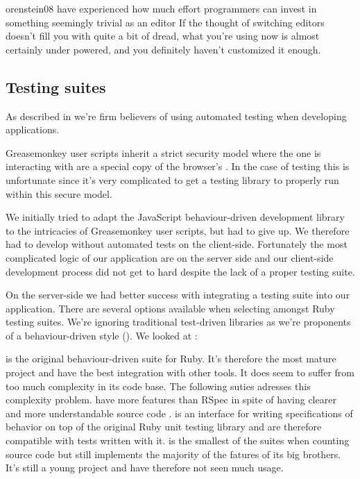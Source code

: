 \begin{fullquote}{orenstein08}{%
  have experienced how much effort programmers can
  invest in something seemingly trivial as an editor}
    If the thought of switching editors doesn't fill you with quite a bit of
    dread, what you're using now is almost certainly under powered, and you
    definitely haven't customized it enough.
\end{fullquote}

\subsection{Testing suites}

As described in  we're firm
believers of using automated testing when developing applications.

Greasemonkey user scripts inherit a strict security model where the
 one is interacting with are a special copy of the browser's
. In the case of testing this is unfortunate since it's very
complicated to get a testing library to properly run within this secure model.

We initially tried to adapt the %
JavaScript behaviour-driven development library to the intricacies of
Greasemonkey user scripts, but had to give up. We therefore had to develop
without automated tests on the client-side.
Fortunately the most complicated logic of our application are on the server
side and our client-side development process did not get to hard despite the
lack of a proper testing suite.

On the server-side we had better success with integrating a testing suite into
our application. There are several options available when selecting amongst
Ruby testing suites. We're ignoring traditional test-driven libraries as
we're proponents of a behaviour-driven style
(). We looked at%
:

\begin{items}
   is the original behaviour-driven suite for Ruby. It's
    therefore the most mature project and have the best integration with
    other tools. It does seem to suffer from too much complexity in its code
    base. The following suties adresses this complexity problem.
   have more features than RSpec in spite of having clearer
    and more understandable source code \citep{klishin08}.
   is an interface for writing specifications of behavior
    on top of the original Ruby unit testing library and are therefore
    compatible with tests written with it.
   is the smallest of the suites when counting source code
    but still implements the majority of the fatures of its big brothers.
    It's still a young project and have therefore not seen much usage.
\end{items}

